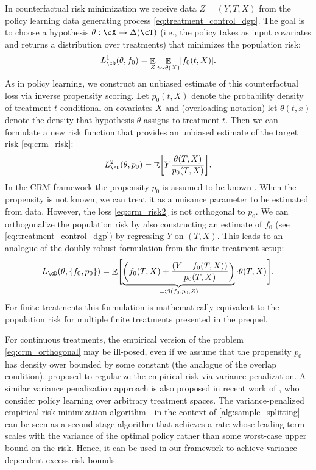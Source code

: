 \documentclass[11pt]{article} %
\newcommand{\pref}[1]{\cref{#1}}
\theoremstyle{theorem}  %
\theoremstyle{plain}
\DeclarePairedDelimiter{\brk}{[}{]}
\DeclarePairedDelimiter{\crl}{\{}{\}}
\DeclarePairedDelimiter{\prn}{(}{)}
\DeclareMathOperator{\En}{\mathbb{E}}
\newcommand{\rdef}{=\vcentcolon}
\begin{document}
In counterfactual risk minimization we receive data $Z=(Y, T, X)$ from the policy learning data generating process \pref{eq:treatment_control_dgp}. The goal is to choose a hypothesis $\theta: \cX\rightarrow \Delta(\cT)$ (i.e., the policy takes as input covariates and returns a distribution over treatments) that minimizes the population risk:
\begin{equation}
\label{eq:crm_risk}
L_{\cD}^1(\theta, f_0) = \En_{Z} \En_{t\sim \theta(X)}\brk*{f_0(t, X)}.
\end{equation}
As in policy learning, we construct an unbiased estimate of this counterfactual loss via inverse propensity scoring. Let $p_0(t, X)$ denote the probability density of treatment $t$ conditional on covariates $X$ and (overloading notation) let $\theta(t,x)$ denote the density that hypothesis $\theta$ assigns to treatment $t$. Then we can formulate a new risk function that provides an unbiased estimate of the target risk \pref{eq:crm_risk}:
\begin{equation}
\label{eq:crm_risk2}
L_{\cD}^2(\theta, p_0) = \En\brk*{Y \frac{\theta(T, X)}{p_0(T,X)}}.
\end{equation}
In the CRM framework the propensity $p_0$ is assumed to be known \citep{swaminathan2015counterfactual,swaminathan2015self}. When the propensity is not known, we can treat it as a nuisance parameter to be estimated from data. However, the loss \pref{eq:crm_risk2} is not orthogonal to $p_0$. We can orthogonalize the population risk by also constructing an estimate of $f_0$ (see \pref{eq:treatment_control_dgp}) by regressing $Y$ on $(T,X)$. This leads to an analogue of the doubly robust formulation from the finite treatment setup:
\begin{equation}
\label{eq:crm_orthogonal}
L_{\cD}(\theta, \crl{f_0, p_0}) = \En\brk[\Bigg]{\underbrace{\prn*{f_0(T, X) + \frac{(Y - f_0(T,X))}{p_0(T,X)}}}_{\rdef\beta(f_0, p_0, Z)}\cdot \theta(T, X)}.
\end{equation}
For finite treatments this formulation is mathematically equivalent to the population risk for multiple finite treatments presented in the prequel.

For continuous treatments, the empirical version of the problem \pref{eq:crm_orthogonal} may be ill-posed, even if we assume that the propensity $p_0$ has density ower bounded by some constant (the analogue of the overlap condition). \cite{swaminathan2015counterfactual} proposed to regularize the empirical risk via variance penalization. A similar variance penalization approach is also proposed in recent work of \cite{bertsimas2018optimization}, who consider policy learning over arbitrary treatment spaces. The variance-penalized empirical risk minimization algorithm---in the context of \pref{alg:sample_splitting}---can be seen as a second stage algorithm that achieves a rate whose leading term scales with the variance of the optimal policy rather than some worst-case upper bound on the risk. Hence, it can be used in our framework to achieve variance-dependent excess risk bounds.
\end{document}
